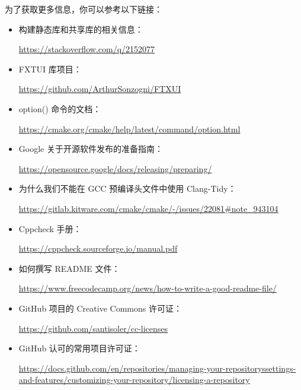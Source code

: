 为了获取更多信息，你可以参考以下链接：

\begin{itemize}
\item
构建静态库和共享库的相关信息：

\url{https://stackoverflow.com/q/2152077}

\item
FXTUI 库项目：

\url{https://github.com/ArthurSonzogni/FTXUI}

\item
option() 命令的文档：

\url{https://cmake.org/cmake/help/latest/command/option.html}

\item
Google 关于开源软件发布的准备指南：

\url{https://opensource.google/docs/releasing/preparing/}

\item
为什么我们不能在 GCC 预编译头文件中使用 Clang-Tidy：

\url{https://gitlab.kitware.com/cmake/cmake/-/issues/22081#note_943104}

\item
Cppcheck 手册：

\url{https://cppcheck.sourceforge.io/manual.pdf}

\item
如何撰写 README 文件：

\url{https://www.freecodecamp.org/news/how-to-write-a-good-readme-file/}

\item
GitHub 项目的 Creative Commons 许可证：

\url{https://github.com/santisoler/cc-licenses}

\item
GitHub 认可的常用项目许可证：

\url{https://docs.github.com/en/repositories/managing-your-repositoryssettings-and-features/customizing-your-repository/licensing-a-repository}
\end{itemize}